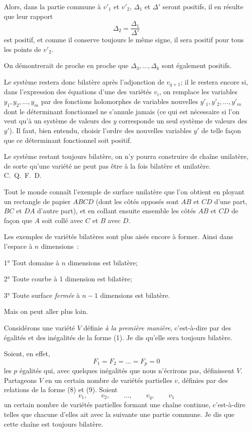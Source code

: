 \documentclass{article}
\begin{document}
Alors, dans la partie commune à $v'_{1}$ et $v'_{2}$, $\Delta_{1}$ et $\Delta'$ seront positifs, il en résulte que leur rapport
\[
\Delta_{2} = \frac{\Delta_{1}}{\Delta'}
\]
est positif, et comme il conserve toujours le même signe, il sera positif pour tous les points de $v'_{2}$.

On démontrerait de proche en proche que $\Delta_{3}, \ldots, \Delta_{k}$ sont également positifs.

Le système restera donc bilatère après l'adjonction de $v_{q+1}$; il le restera encore si, dans l'expression des équations d'une des variétés $v_{i}$, on remplace les variables $y_{1}, y_{2}, \ldots, y_{m}$ par des fonctions holomorphes de variables nouvelles $y'_{1}, y'_{2}, \ldots, y'_{m}$ dont le déterminant fonctionnel ne s'annule jamais (ce qui est nécessaire si l'on veut qu'à un système de valeurs des $y$ corresponde un seul système de valeurs des $y'$). Il faut, bien entendu, choisir l'ordre des nouvelles variables $y'$ de telle façon que ce déterminant fonctionnel soit positif.

Le système restant toujours bilatère, on n'y pourra construire de chaîne unilatère, de sorte qu'une variété ne peut pas être à la fois bilatère et unilatère. C.~Q.~F.~D.

Tout le monde connaît l'exemple de surface unilatère que l'on obtient en ployant un rectangle de papier $ABCD$ (dont les côtés opposés sont $AB$ et $CD$ d'une part, $BC$ et $DA$ d'autre part), et en collant ensuite ensemble les côtés $AB$ et $CD$ de façon que $A$ soit collé avec $C$ et $B$ avec $D$.

Les exemples de variétés bilatères sont plus aisés encore à former. Ainsi dans l'espace à $n$ dimensions~:

1° Tout domaine à $n$ dimensions est bilatère;

2° Toute courbe à 1 dimension est bilatère;

3° Toute surface \emph{fermée} à $n - 1$ dimensions est bilatère.

Mais on peut aller plus loin.

Considérons une variété $V$ définie \emph{à la première manière}, c'est-à-dire par des égalités et des inégalités de la forme (1). Je dis qu'elle sera toujours bilatère.

Soient, en effet,
\[
F_{1} = F_{2} = \ldots = F_{p} = 0
\]
les $p$ égalités qui, avec quelques inégalités que nous n'écrirons pas, définissent $V$. Partageons $V$ en un certain nombre de variétés partielles $v$, définies par des relations de la forme (8) et (9). Soient
\[
v_{1}, \qquad v_{2}, \qquad \ldots, \qquad v_{q}, \qquad v_{1}
\]
un certain nombre de variétés partielles formant une chaîne continue, c'est-à-dire telles que chacune d'elles ait avec la suivante une partie commune. Je dis que cette chaîne est toujours bilatère.
\end{document}
